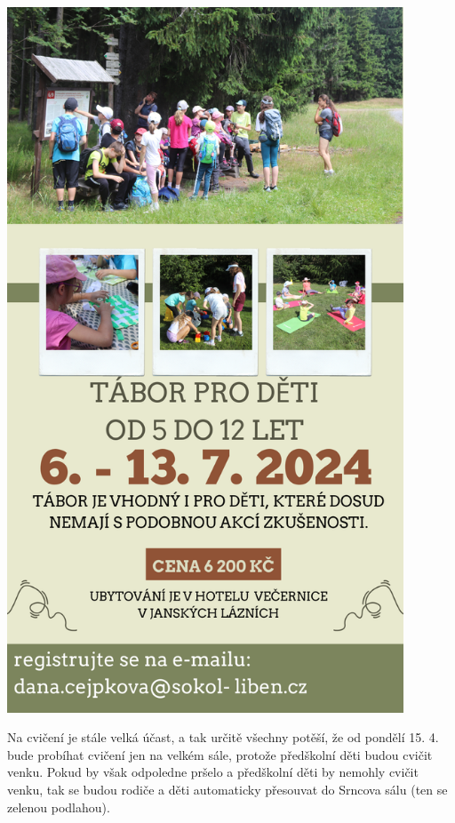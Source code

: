 \documentclass[11pt]{article}
\begin{document}
\pagestyle{blank}
\begin{center}
  \noindent\includegraphics[height=210mm]{tabor_pd_2024.png}
\end{center}
\restoregeometry

\clearpage
\pagestyle{standard}

Na cvičení je stále velká účast, a tak určitě všechny potěší, že od pondělí 15. 4. bude probíhat cvičení jen na velkém sále, protože předškolní děti budou cvičit venku. Pokud by však odpoledne pršelo a předškolní děti by nemohly cvičit venku, tak se budou rodiče a děti automaticky přesouvat do Srncova sálu (ten se zelenou podlahou).
\end{document}
